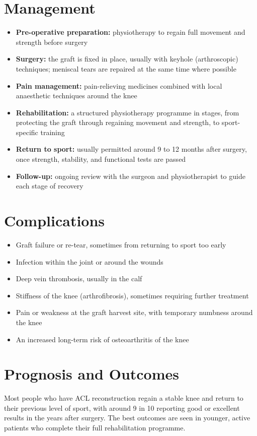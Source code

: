 \section*{Management}
\begin{itemize}
    \item \textbf{Pre-operative preparation:} physiotherapy to regain full movement and strength before surgery
    \item \textbf{Surgery:} the graft is fixed in place, usually with keyhole (arthroscopic) techniques; meniscal tears are repaired at the same time where possible
    \item \textbf{Pain management:} pain-relieving medicines combined with local anaesthetic techniques around the knee
    \item \textbf{Rehabilitation:} a structured physiotherapy programme in stages, from protecting the graft through regaining movement and strength, to sport-specific training
    \item \textbf{Return to sport:} usually permitted around 9 to 12 months after surgery, once strength, stability, and functional tests are passed
    \item \textbf{Follow-up:} ongoing review with the surgeon and physiotherapist to guide each stage of recovery
\end{itemize}

\section*{Complications}
\begin{itemize}
    \item Graft failure or re-tear, sometimes from returning to sport too early
    \item Infection within the joint or around the wounds
    \item Deep vein thrombosis, usually in the calf
    \item Stiffness of the knee (arthrofibrosis), sometimes requiring further treatment
    \item Pain or weakness at the graft harvest site, with temporary numbness around the knee
    \item An increased long-term risk of osteoarthritis of the knee
\end{itemize}

\section*{Prognosis and Outcomes}
Most people who have ACL reconstruction regain a stable knee and return to their previous level of sport, with around 9 in 10 reporting good or excellent results in the years after surgery. The best outcomes are seen in younger, active patients who complete their full rehabilitation programme.

